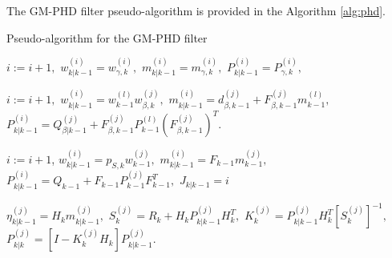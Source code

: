 The GM-PHD filter pseudo-algorithm is provided in the Algorithm \ref{alg:phd}.
\begin{algorithm}[h]
    \caption{Pseudo-algorithm for the GM-PHD filter}
    \begin{algorithmic}[1]

        \State
            \State $i:= i+1,$
            \State $w_{k|k-1}^{(i)} = w_{\gamma,k}^{(i)},$ \quad
            $m_{k|k-1}^{(i)} = m_{\gamma,k}^{(i)},$ \quad
            $P_{k|k-1}^{(i)} = P_{\gamma,k}^{(i)},$
        \EndFor

                \State $i:=i+1,$
                \State $w_{k|k-1}^{(i)} = w_{k-1}^{(l)} w_{\beta,k}^{(j)},$
                \State $m_{k|k-1}^{(i)} = d_{\beta,k-1}^{(j)} + F_{\beta,k-1}^{(j)} m_{k-1}^{(l)},$
                \State $P_{k|k-1}^{(i)} = Q_{\beta|k-1}^{(j)} + F_{\beta,k-1}^{(j)} P_{k-1}^{(l)} (F_{\beta,k-1}^{(j)})^T.$
            \EndFor
        \EndFor
        \EndProcedure
        \State


            \State $i:=i+1$,
            \State $w_{k|k-1}^{(i)} = p_{S,k} w_{k-1}^{(j)},$
            \State $m_{k|k-1}^{(i)} = F_{k-1} m_{k-1}^{(j)},$
            \State $P_{k|k-1}^{(i)} = Q_{k-1} + F_{k-1} P_{k-1}^{(j)} F_{k-1}^T,$
        \EndFor
        \State $J_{k|k-1} = i$
        \EndProcedure

        \State
            \State $\eta_{k|k-1}^{(j)} = H_k m_{k|k-1}^{(j)},$ \quad
             $S_k^{(j)} = R_k + H_k P_{k|k-1}^{(j)} H_k^T,$
            \State $K_k^{(j)} = P_{k|k-1}^{(j)} H_k^T [S_k^{(j)}]^{-1},$ \quad
             $P_{k|k}^{(j)} = [I - K_k^{(j)} H_k] P_{k|k-1}^{(j)}.$
        \EndFor
        \EndProcedure


\end{algorithmic}
\end{algorithm}
